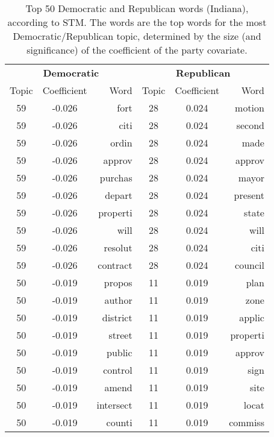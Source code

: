 \begin{table}[ht]
\centering
\caption{Top 50 Democratic and Republican words (Indiana), according to STM. 
             The words are the top words for the most Democratic/Republican topic, determined
             by the size (and significance) of the coefficient of the party covariate.} 
\label{tabSTMIN}
\begingroup\footnotesize
\begin{tabular}{ccr|ccr}
  \toprule 
 \multicolumn{3}{c}{\textbf{Democratic}} & \multicolumn{3}{c}{\textbf{Republican}} \\
 \cmidrule(l){1-3} \cmidrule(l){4-6}
  Topic & Coefficient & Word & Topic & Coefficient & Word \\
 \midrule 
   59 & -0.026 & fort &   28 & 0.024 & motion \\ 
    59 & -0.026 & citi &   28 & 0.024 & second \\ 
    59 & -0.026 & ordin &   28 & 0.024 & made \\ 
    59 & -0.026 & approv &   28 & 0.024 & approv \\ 
    59 & -0.026 & purchas &   28 & 0.024 & mayor \\ 
    59 & -0.026 & depart &   28 & 0.024 & present \\ 
    59 & -0.026 & properti &   28 & 0.024 & state \\ 
    59 & -0.026 & will &   28 & 0.024 & will \\ 
    59 & -0.026 & resolut &   28 & 0.024 & citi \\ 
    59 & -0.026 & contract &   28 & 0.024 & council \\ 
   \cmidrule(l){1-3} \cmidrule(l){4-6}
  50 & -0.019 & propos &   11 & 0.019 & plan \\ 
    50 & -0.019 & author &   11 & 0.019 & zone \\ 
    50 & -0.019 & district &   11 & 0.019 & applic \\ 
    50 & -0.019 & street &   11 & 0.019 & properti \\ 
    50 & -0.019 & public &   11 & 0.019 & approv \\ 
    50 & -0.019 & control &   11 & 0.019 & sign \\ 
    50 & -0.019 & amend &   11 & 0.019 & site \\ 
    50 & -0.019 & intersect &   11 & 0.019 & locat \\ 
    50 & -0.019 & counti &   11 & 0.019 & commiss \\ 

\end{tabular}
\end{table}
